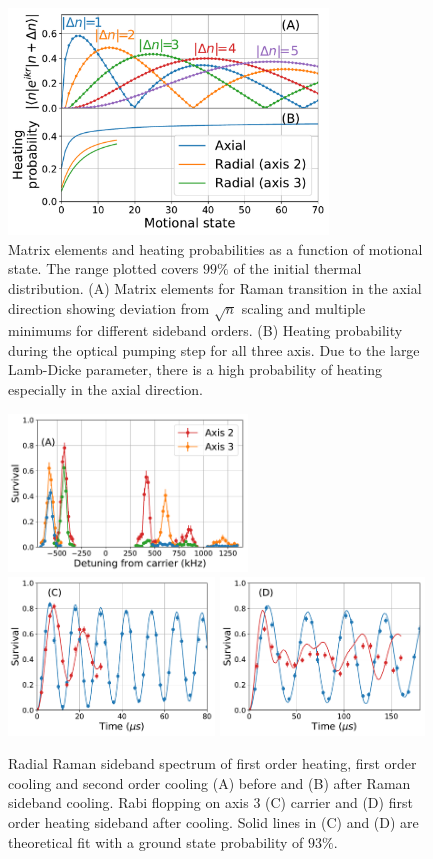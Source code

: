 \documentclass[aps,prl,twocolumn,groupedaddress]{revtex4-1}
\begin{document}
\begin{figure}[b]
  \includegraphics[width=8.5cm]{imgs/fig2_raman_op.pdf}
  \caption{Matrix elements and heating probabilities as a function of motional state.
    The range plotted covers $99\%$ of the initial thermal distribution.
    (A) Matrix elements for Raman transition in the axial direction showing deviation from
    $\sqrt{n}$ scaling and multiple minimums for different sideband orders.
    (B) Heating probability during the optical pumping step for all three axis.
    Due to the large Lamb-Dicke parameter,
    there is a high probability of heating especially in the axial direction.
    \label{f-ld}}
\end{figure}
\begin{figure}
  \includegraphics[height=4.2cm]{imgs/spectrum_r.pdf}
  \includegraphics[height=4.2cm]{imgs/rabi_flop_r3_0.pdf}
  \includegraphics[height=4.2cm]{imgs/rabi_flop_r3_p1.pdf}
  \caption{Radial Raman sideband spectrum of first order heating, first order cooling and
    second order cooling (A) before and (B) after Raman sideband cooling.
    Rabi flopping on axis 3 (C) carrier and (D) first order heating sideband
    after cooling.
    Solid lines in (C) and (D) are theoretical fit with a ground state probability of $93\%$.
    \label{f-radial}}
\end{figure}
\end{document}
